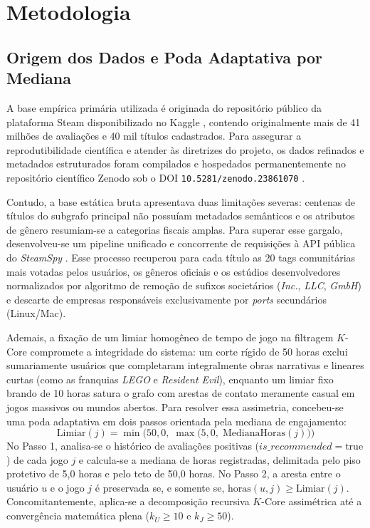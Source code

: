 \documentclass[conference]{IEEEtran}
\begin{document}
\section{Metodologia}

\subsection{Origem dos Dados e Poda Adaptativa por Mediana}
A base empírica primária utilizada é originada do repositório público da plataforma Steam disponibilizado no Kaggle \cite{kaggle}, contendo originalmente mais de 41 milhões de avaliações e 40 mil títulos cadastrados. Para assegurar a reprodutibilidade científica e atender às diretrizes do projeto, os dados refinados e metadados estruturados foram compilados e hospedados permanentemente no repositório científico Zenodo sob o DOI \texttt{10.5281/zenodo.23861070} \cite{zenodo}.

Contudo, a base estática bruta apresentava duas limitações severas: centenas de títulos do subgrafo principal não possuíam metadados semânticos e os atributos de gênero resumiam-se a categorias fiscais amplas. Para superar esse gargalo, desenvolveu-se um pipeline unificado e concorrente de requisições à API pública do \textit{SteamSpy} \cite{steamspy}. Esse processo recuperou para cada título as 20 tags comunitárias mais votadas pelos usuários, os gêneros oficiais e os estúdios desenvolvedores normalizados por algoritmo de remoção de sufixos societários (\textit{Inc.}, \textit{LLC}, \textit{GmbH}) e descarte de empresas responsáveis exclusivamente por \textit{ports} secundários (Linux/Mac).

Ademais, a fixação de um limiar homogêneo de tempo de jogo na filtragem $K$-Core compromete a integridade do sistema: um corte rígido de 50 horas exclui sumariamente usuários que completaram integralmente obras narrativas e lineares curtas (como as franquias \textit{LEGO} e \textit{Resident Evil}), enquanto um limiar fixo brando de 10 horas satura o grafo com arestas de contato meramente casual em jogos massivos ou mundos abertos. Para resolver essa assimetria, concebeu-se uma poda adaptativa em dois passos orientada pela mediana de engajamento:
\begin{equation}
\text{Limiar}(j) = \min\Big(50{,}0,\; \max\big(5{,}0,\; \text{MedianaHoras}(j)\big)\Big)
\label{eq:limiar_adaptativo}
\end{equation}
No Passo 1, analisa-se o histórico de avaliações positivas ($is\_recommended = \text{true}$) de cada jogo $j$ e calcula-se a mediana de horas registradas, delimitada pelo piso protetivo de 5,0 horas e pelo teto de 50,0 horas. No Passo 2, a aresta entre o usuário $u$ e o jogo $j$ é preservada se, e somente se, $\text{horas}(u, j) \ge \text{Limiar}(j)$. Concomitantemente, aplica-se a decomposição recursiva $K$-Core assimétrica até a convergência matemática plena ($k_U \ge 10$ e $k_J \ge 50$). 
\end{document}
